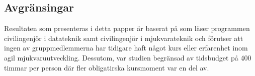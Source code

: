 \subsection{Avgränsingar}
\label{subsec:Lieth-delimitations}
Resultaten som presenteras i detta papper är baserat på som läser programmen civilingenjör i datateknik samt civilingenjör i mjukvarateknik och förutser att
ingen av gruppmedlemmerna har tidigare haft något kurs eller erfarenhet inom agil mjukvaruutveckling. Dessutom, var studien begränsad av tidsbudget på 
400 timmar per person där fler obligatirska kursmoment var en del av.


